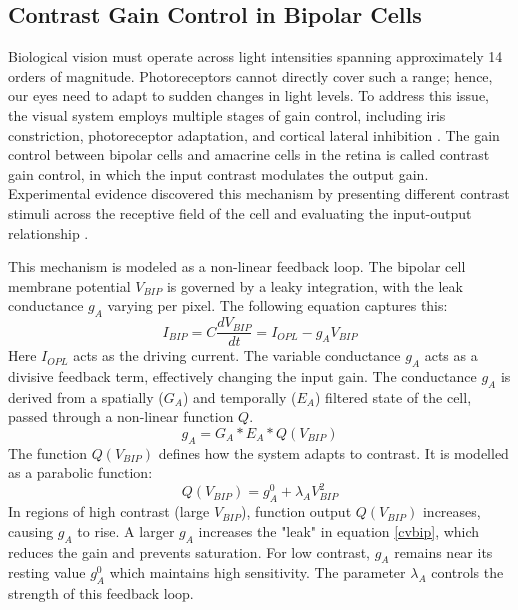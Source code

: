 \documentclass{article}
\begin{document}
\subsection{Contrast Gain Control in Bipolar Cells }
\label{sec:adaptation}
Biological vision must operate across light intensities spanning approximately 14 orders of magnitude. Photoreceptors cannot directly cover such a range; hence, our eyes need to adapt to sudden changes in light levels. To address this issue, the visual system employs multiple stages of gain control, including iris constriction, photoreceptor adaptation, and cortical lateral inhibition \cite{wohrer_virtual_2009,shapley_effect_1978,baccus_fast_2002}. The gain control between bipolar cells and amacrine cells in the retina is called contrast gain control, in which the input contrast modulates the output gain. Experimental evidence discovered this mechanism by presenting different contrast stimuli across the receptive field of the cell and evaluating the input-output relationship \cite{wohrer_virtual_2009}.



This mechanism is modeled as a non-linear feedback loop. The bipolar cell membrane potential $V_{BIP}$ is governed by a leaky integration, with the leak conductance $g_{A}$ varying per pixel. The following equation captures this: 
\begin{equation}
     I_{BIP}=C\frac{dV_{BIP}}{dt} = I_{OPL} - g_{A}V_{BIP}
     \label{cvbip}
 \end{equation}
Here $I_{OPL}$ acts as the driving current. The variable conductance $g_{A}$ acts as a divisive feedback term, effectively changing the input gain.  The conductance $g_{A}$ is derived from a spatially ($G_{A}$) and temporally ($E_{A}$) filtered state of the cell, passed through a non-linear function $Q$.
\begin{equation}
       g_{A} = G_{A}*E_{A}*Q(V_{BIP})
       \label{ga}
 \end{equation}
The function $Q(V_{BIP})$ defines how the system adapts to contrast. It is modelled as a parabolic function: 
\begin{equation}
    Q(V_{BIP}) = g^0_{A} + \lambda_{A} V_{BIP}^{2}
     \label{qfunc}
 \end{equation}
In regions of high contrast (large $V_{BIP}$), function output $Q(V_{BIP})$ increases, causing $g_{A}$ to rise. A larger $g_{A}$ increases the "leak" in equation \ref{cvbip}, which reduces the gain and prevents saturation. For low contrast, $g_{A}$ remains near its resting value $g^0_{A}$ which maintains high sensitivity. The parameter $\lambda_{A}$ controls the strength of this feedback loop.
\end{document}
